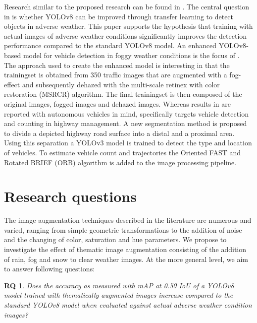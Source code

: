 \documentclass[]{article}
\newtheorem{researchquestion}{RQ}
\begin{document}
	Research similar to the proposed research can be found in \cite{kumarObjectDetectionAdverse2023}. The central question in \cite{kumarObjectDetectionAdverse2023} is whether YOLO{\small v8} can be improved through transfer learning to detect objects in adverse weather. This paper supports the hypothesis that training with actual images of adverse weather conditions significantly improves the detection performance compared to the standard YOLO{\small v8} model. An enhanced YOLO\small{v8}-based model for vehicle detection in foggy weather conditions is the focus of \cite{liVehicleDetectionFoggy2022}. The approach used to create the enhanced model is interesting in that the trainingset is obtained from 350 traffic images that are augmented with a fog-effect and subsequently dehazed with the multi-scale retinex with color restoration (MSRCR) algorithm. The final trainingset is then composed of the original images, fogged images and dehazed images. Whereas results in \cite{liVehicleDetectionFoggy2022} are reported with autonomous vehicles in mind, \cite{songVisionbasedVehicleDetection2019} specifically targets vehicle detection and counting in highway management.  A new segmentation method is proposed to divide a depicted highway road surface into a distal and a proximal area. Using this separation a YOLO{\small v3} model is trained to detect the type and location of vehicles. To estimate vehicle count and trajectories the Oriented FAST and Rotated BRIEF (ORB) algorithm is added to the image processing pipeline.
	

\section{Research questions}

	The image augmentation techniques described in the literature are numerous and varied, ranging from simple geometric transformations to the addition of noise and the changing of color, saturation and hue parameters. We propose to investigate the effect of thematic image augmentation consisting of the addition of rain, fog and snow to clear weather images. At the more general level, we aim to answer following questions:

	\begin{researchquestion}
		\label{rq1}
		Does the accuracy as measured with mAP at 0.50 IoU of a YOLO{\small v8} model trained with thematically augmented images increase compared to the standard YOLO{\small v8} model when evaluated against actual adverse weather condition images?
	\end{researchquestion}
\end{document}

